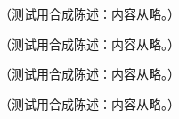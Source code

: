 \begin{remark}\label{rem:appM-svz}
（测试用合成陈述：内容从略。）
\end{remark}

\begin{remark}[支持性的严格结果]\label{rem:appM-supporting}
（测试用合成陈述：内容从略。）
\end{remark}

\begin{remark}[瞬子与渐近性]\label{rem:appM-instantons}
（测试用合成陈述：内容从略。）
\end{remark}

\begin{remark}[真空 OPE]\label{rem:appM-vacuum}
（测试用合成陈述：内容从略。）
\end{remark}
